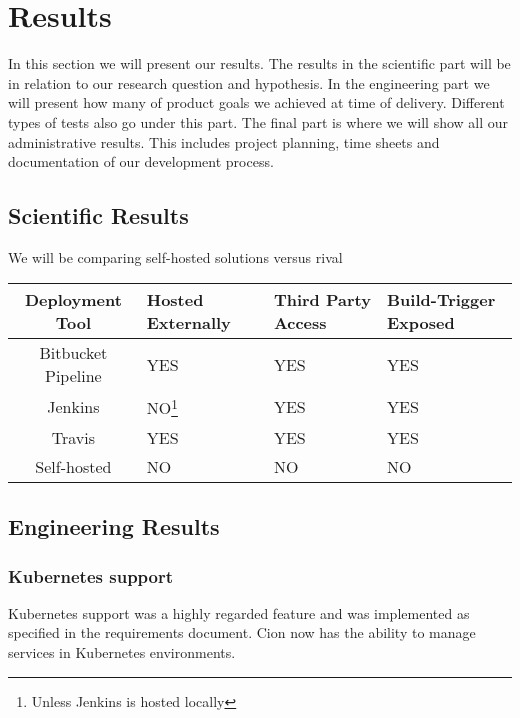 \chapter{Results}
\label{chap:results}

In this section we will present our results. The results in the scientific part will be in relation to our research question and hypothesis. In the engineering part we will present how many of product goals we achieved at time of delivery. Different types of tests also go under this part. The final part is where we will show all our administrative results. This includes project planning, time sheets and documentation of our development process.

\section{Scientific Results}
We will be comparing self-hosted solutions versus rival 

\begin{tabularx}{\linewidth}{|c||X|X|X|}
    \hline
    Deployment Tool & Hosted Externally & Third Party Access & Build-Trigger Exposed \\ \hline\hline
    Bitbucket Pipeline & YES & YES & YES \\ \hline
    Jenkins & NO\footnote{Unless Jenkins is hosted locally} & YES & YES \\ \hline
    Travis & YES & YES & YES \\ \hline
    Self-hosted & NO & NO & NO \\ \hline
\end{tabularx}

\section{Engineering Results}

\subsection{Kubernetes support}
Kubernetes support was a highly regarded feature and was implemented as specified in the requirements document. Cion now has the ability to manage services in Kubernetes environments.



